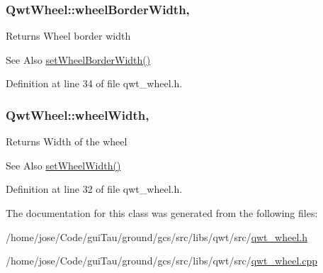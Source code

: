 \hypertarget{class_qwt_wheel_a5ab122a2d17ca9a985715f6c777c0183}{
\subsubsection[{wheel\-Border\-Width}]{ Qwt\-Wheel\-::wheel\-Border\-Width\hspace{0.3cm}{\ttfamily [read]}, {\ttfamily [write]}}}\label{class_qwt_wheel_a5ab122a2d17ca9a985715f6c777c0183}
\begin{DoxyReturn}{Returns}
Wheel border width 
\end{DoxyReturn}
\begin{DoxySeeAlso}{See Also}
\hyperlink{class_qwt_wheel_a4aa70134746908cef687e3c1bb7aa60c}{set\-Wheel\-Border\-Width()} 
\end{DoxySeeAlso}


Definition at line 34 of file qwt\-\_\-wheel.\-h.

\hypertarget{class_qwt_wheel_ac6209286cc86f618e6866a4b6164d896}{
\subsubsection[{wheel\-Width}]{ Qwt\-Wheel\-::wheel\-Width\hspace{0.3cm}{\ttfamily [read]}, {\ttfamily [write]}}}\label{class_qwt_wheel_ac6209286cc86f618e6866a4b6164d896}
\begin{DoxyReturn}{Returns}
Width of the wheel 
\end{DoxyReturn}
\begin{DoxySeeAlso}{See Also}
\hyperlink{class_qwt_wheel_ac434254039981344ccca22c76bce4f38}{set\-Wheel\-Width()} 
\end{DoxySeeAlso}


Definition at line 32 of file qwt\-\_\-wheel.\-h.



The documentation for this class was generated from the following files\-:\begin{DoxyCompactItemize}
\item 
/home/jose/\-Code/gui\-Tau/ground/gcs/src/libs/qwt/src/\hyperlink{qwt__wheel_8h}{qwt\-\_\-wheel.\-h}\item 
/home/jose/\-Code/gui\-Tau/ground/gcs/src/libs/qwt/src/\hyperlink{qwt__wheel_8cpp}{qwt\-\_\-wheel.\-cpp}\end{DoxyCompactItemize}
